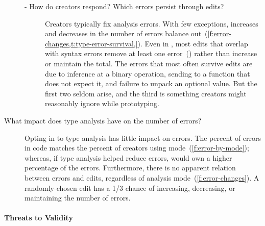 \documentclass[english,submission,cleveref]{programming}
\begin{document}
\begin{description}
\begin{description}
      \item[- How do creators respond? Which errors persist through edits?]
        Creators typically fix analysis errors.
        With few exceptions, increases and decreases in the number of errors
        balance out~(\cref{f:error-changes,t:type-error-survival,}).
        Even in \mnocheck{}, most edits that overlap with syntax errors
        remove at least one error~() rather than increase or maintain
        the total.
        The errors that most often survive edits are due to
        inference at a binary operation,
        sending  to a function that does not expect it,
        and failure to unpack an optional value.
        But the first two seldom arise, and the third is something creators
        might reasonably ignore while prototyping.


    \end{description}

  \item[What impact does type analysis have on the number of \FS{} errors?]
    Opting in to type analysis has little impact on \FS{} errors.
    The percent of \FS{} errors in \mnocheck{} code matches the percent of
    creators using \mnocheck{} mode~(\cref{f:error-by-mode}); whereas,
    if type analysis helped reduce \FS{} errors, \mnocheck{} would own a
    higher percentage of the errors.
    Furthermore, there is no apparent relation between \FS{} errors and edits,
    regardless of analysis mode~(\cref{f:error-changes}).
    A randomly-chosen edit has a 1/3 chance of increasing, decreasing, or
    maintaining the number of \FS{} errors.

\end{description}


\paragraph{Threats to Validity}
\label{s:threats}
\end{document}
